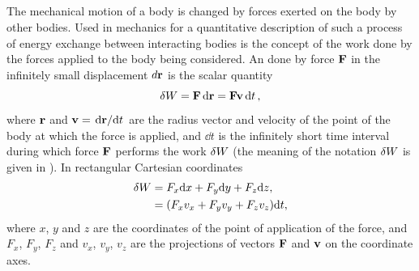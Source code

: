 \subsection{}\label{3.1.2} The mechanical motion of a body is changed by forces exerted on the body by other bodies. Used in mechanics for a
quantitative description of such a process of energy exchange between interacting bodies is the concept of the work done by the forces applied to the body being considered. An  done by force $\vb{F}$ in the infinitely small displacement $d\vb{r}$ is the scalar quantity
\begin{equation*}%
\var{W}= \vb{F}\,\dd\vb{r}= \vb{Fv}\dd{t},
\end{equation*}
where $\vb{r}$ and $\vb{v} = \dv*{\vb{r}}{t}$ are the radius vector and velocity of the point of the body at which the force is applied, and $\dd t$ is the infinitely short time interval during which force $\vb{F}$ performs the work $\var{W}$ (the meaning of the notation $\var{W}$ is given in ). In rectangular Cartesian coordinates
\begin{align*}%
\var{W} & = F_{x}\dd x + F_{y}\dd y + F_{z}\dd z, \\
&  = (F_{x}v_{x}+ F_{y}v_{y} + F_{z}v_{z}) \dd t,
\end{align*}
where $x$, $y$ and $z$ are the coordinates of the point of application of the force, and $F_{x}$, $F_{y}$, $F_{z}$ and $v_{x}$, $v_{y}$, $v_{z}$ are the projections of vectors $\vb{F}$ and $\vb{v}$ on the coordinate axes.


